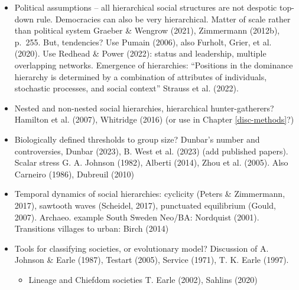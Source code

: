 \documentclass[
  12pt,
]{book}
\providecommand{\tightlist}{%
  \setlength{\itemsep}{0pt}\setlength{\parskip}{0pt}}
\begin{document}
\begin{itemize}
\item
  Political assumptions -- all hierarchical social structures are not despotic top-down rule. Democracies can also be very hierarchical. Matter of scale rather than political system Graeber \& Wengrow (2021), Zimmermann (2012b), p.~255. But, tendencies? Use Pumain (2006), also Furholt, Grier, et al. (2020). Use Redhead \& Power (2022): status and leadership, multiple overlapping networks. Emergence of hierarchies: ``Positions in the dominance hierarchy is determined by a combination of attributes of individuals, stochastic processes, and social context'' Strauss et al. (2022).
\item
  Nested and non-nested social hierarchies, hierarchical hunter-gatherers? Hamilton et al. (2007), Whitridge (2016) (or use in Chapter \ref{disc-methods}?)
\item
  Biologically defined thresholds to group size? Dunbar's number and controversies, Dunbar (2023), B. West et al. (2023) (add published papers). Scalar stress G. A. Johnson (1982), Alberti (2014), Zhou et al. (2005). Also Carneiro (1986), Dubreuil (2010)
\item
  Temporal dynamics of social hierarchies: cyclicity (Peters \& Zimmermann, 2017), sawtooth waves (Scheidel, 2017), punctuated equilibrium (Gould, 2007). Archaeo. example South Sweden Neo/BA: Nordquist (2001). Transitions villages to urban: Birch (2014)
\end{itemize}

\begin{itemize}
\item
  Tools for classifying societies, or evolutionary model? Discussion of A. Johnson \& Earle (1987), Testart (2005), Service (1971), T. K. Earle (1997).

  \begin{itemize}
  \tightlist
  \item
    Lineage and Chiefdom societies T. Earle (2002), Sahlins (2020)
  \end{itemize}
\end{itemize}
\end{document}
